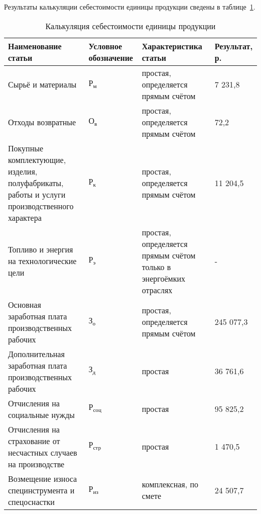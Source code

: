 Результаты калькуляции себестоимости единицы продукции
сведены в таблице~\ref{tbl:results}.
\begin{table}[h!]
  \caption{Калькуляция себестоимости единицы продукции}
  \label{tbl:results}
  \centering
  \small{
    \begin{tabular}{| p{} | p{} |
                      p{} | p{} |}
      \hline

      Наименование статьи & Условное \newline обозначение &
      Характеристика статьи & Результат, р.
      \\ \hline

      Сырьё и материалы & $ \text{Р}_{\text{м}} $ &
      простая, определяется прямым счётом &
      7 231,8 \\ \hline

      Отходы возвратные & $ \text{О}_{\text{в}} $ &
      простая, определяется прямым счётом &
      72,2 \\ \hline

      Покупные комплектующие, изделия, полуфабрикаты, работы и услуги
      производственного характера & $ \text{Р}_{\text{к}} $ &
      простая, определяется прямым счётом &
      11 204,5 \\ \hline

      Топливо и энергия на технологические цели & $ \text{Р}_{\text{э}} $ &
      простая, определяется прямым счётом только в энергоёмких отраслях &
      - \\ \hline

      Основная заработная плата производственных рабочих & $ \text{З}_{\text{о}} $ &
      простая, определяется прямым счётом &
      245 077,3 \\ \hline

      Дополнительная \newline заработная плата производственных рабочих
      & $ \text{З}_{\text{д}} $ & простая &
      36 761,6 \\ \hline

      Отчисления на социальные нужды & $ \text{Р}_{\text{соц}} $ &
      простая &
      95 825,2 \\ \hline

      Отчисления на страхование от несчастных случаев на \newline производстве &
      $ \text{Р}_{\text{стр}} $ & простая &
      1 470,5 \\ \hline

      Возмещение износа специнструмента и спецоснастки & $ \text{Р}_{\text{из}} $ &
      комплексная, по смете &
      24 507,7 \\ \hline


\end{tabular}}
\end{table}
